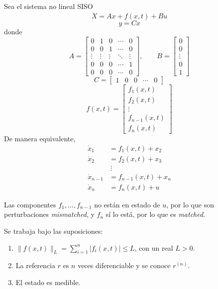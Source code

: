 \clearpage
\begin{flushright}
\end{flushright}

\subsection{\texorpdfstring{}{SMC-AEM para sistemas de orden superior}}

Sea el sistema no lineal SISO
\[
  \dot{X}=Ax+f(x,t)+Bu
\]
\[
  y=Cx
\]
donde
\[
  A=
  \begin{bmatrix}
    0 & 1 & 0 & \cdots & 0\\
    0 & 0 & 1 & \cdots & 0\\
    \vdots & \vdots & \vdots & \ddots & \vdots\\
    0 & 0 & 0 & \cdots & 1\\
    0 & 0 & 0 & \cdots & 0
  \end{bmatrix},
  \qquad
  B=
  \begin{bmatrix}
    0\\
    0\\
    \vdots\\
    0\\
    1
  \end{bmatrix}
\]
\[
  C=\begin{bmatrix}1 & 0 & 0 & \cdots & 0\end{bmatrix}
\]
\[
  f(x,t)=
  \begin{bmatrix}
    f_1(x,t)\\
    f_2(x,t)\\
    \vdots\\
    f_{n-1}(x,t)\\
    f_n(x,t)
  \end{bmatrix}
\]
De manera equivalente,
\begin{align*}
  \dot{x}_1 &= f_1(x,t)+x_2\\
  \dot{x}_2 &= f_2(x,t)+x_3\\
  &\ \vdots\\
  \dot{x}_{n-1} &= f_{n-1}(x,t)+x_n\\
  \dot{x}_n &= f_n(x,t)+u
\end{align*}

Las componentes $f_1,\ldots,f_{n-1}$ no están en estado de $u$, por lo que
son perturbaciones \textit{mismatched}, y $f_n$ sí lo está, por lo que es
\textit{matched}.

Se trabaja bajo las suposiciones:
\begin{enumerate}
  \item $\lVert f(x,t)\rVert_L=
  \displaystyle\sum_{i=1}^{n}\lvert f_i(x,t)\rvert\leq L$,
  con un real $L>0$.
  \item La referencia $r$ es $n$ veces diferenciable y se conoce $r^{(n)}$.
  \item El estado es medible.
\end{enumerate}

